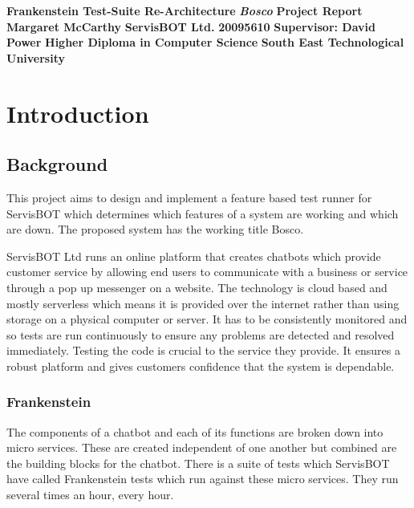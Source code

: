 \documentclass[12pt,a4paper,titlepage]{report}
\newcommand\AcademicTitle{Frankenstein Test-Suite Re-Architecture}
\newcommand\CommericalTitle{Bosco}
\newcommand\Author{Margaret McCarthy}
\newcommand\StudentID{20095610}
\newcommand\Report{Project Report}
\newcommand\Stakeholder{ServisBOT Ltd.}
\newcommand\Course{Higher Diploma in Computer Science}
\newcommand\Reader{Supervisor: David Power}
\newcommand\University{South East Technological University}
\begin{document}

\thispagestyle{empty}
\begin{center}
  \mbox{}\vfill
  {\fontsize{18pt}{20pt}\selectfont \bfseries \AcademicTitle}
  \vfill
  {\fontsize{14pt}{20pt}\selectfont \bfseries\itshape \CommericalTitle}
  \vfill
  {\fontsize{12pt}{20pt}\selectfont \bfseries \Report}
  \vfill
  {\fontsize{14pt}{20pt}\selectfont \bfseries \Author}
  \vfill
  {\fontsize{14pt}{20pt}\selectfont \bfseries \Stakeholder}
  \vfill
  {\fontsize{14pt}{20pt}\selectfont \bfseries \StudentID}
  \vfill
  {\fontsize{14pt}{20pt}\selectfont \bfseries \Reader}
  \vfill
  {\fontsize{14pt}{20pt}\selectfont \bfseries \Course}
  \vfill
  {\fontsize{14pt}{20pt}\selectfont \bfseries \University}
  \vfill
\end{center}
\clearpage

\tableofcontents

\listoftables

\listoffigures

\clearpage
{}
\setcounter{page}{1}

\chapter{Introduction}

\section{Background}

This project aims to design and implement a feature based test runner for ServisBOT which determines which features of a system are working and which are down. The proposed system has the working title Bosco.

ServisBOT Ltd runs an online platform that creates chatbots which provide customer service by allowing end users to communicate with a business or service through a pop up messenger on a website. The technology is cloud based and mostly serverless which means it is provided over the internet rather than using storage on a physical computer or server. It has to be consistently monitored and so tests are run continuously to ensure any problems are detected and resolved immediately. Testing the code is crucial to the service they provide. It ensures a robust platform and gives customers confidence that the system is dependable.

\subsection{Frankenstein}
The components of a chatbot and each of its functions are broken down into micro services. These are created independent of one another but combined are the building blocks for the chatbot. There is a suite of tests which ServisBOT have called Frankenstein tests which run against these micro services. They run several times an hour, every hour. 
\end{document}
